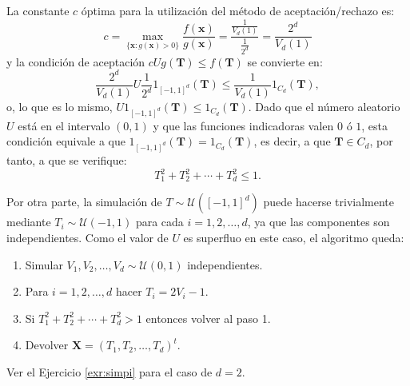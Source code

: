 \documentclass[
]{book}
\theoremstyle{break}
\theoremstyle{definition}
\theoremstyle{definition}
\theoremstyle{definition}
\theoremstyle{definition}
\theoremstyle{remark}
\begin{document}
La constante \(c\) óptima para la utilización del método de
aceptación/rechazo es:
\[c=\max_{\{\mathbf{x}:g\left( \mathbf{x}\right) > 0\}}
\frac{f\left( \mathbf{x}\right)  }{g\left( \mathbf{x}\right)  }
=\frac{\frac{1}{V_d\left( 1\right)  }}{\frac{1}{2^{d}}}
=\frac{2^{d}}{V_d\left( 1\right)}\]
y la condición de aceptación \(cUg\left( \mathbf{T}\right) \leq f\left( \mathbf{T}\right)\) se convierte en:
\[\frac{2^{d}}{V_d\left( 1\right)  }U\frac{1}{2^{d}}1_{\left[  -1,1\right]
^{d}}\left( \mathbf{T}\right)  \leq\frac{1}{V_d\left( 1\right)
}1_{C_d}\left( \mathbf{T}\right),\]
o, lo que es lo mismo, \(U1_{\left[ -1,1\right]^{d}}\left( \mathbf {T}\right) \leq1_{C_d}\left( \mathbf{T}\right)\).
Dado que el número aleatorio \(U\) está en el intervalo \((0,1)\) y que las funciones
indicadoras valen \(0\) ó \(1\), esta condición equivale a que \(1_{\left[ -1,1\right] ^{d}}\left( \mathbf{T}\right) =1_{C_d}\left( \mathbf{T}\right)\), es decir, a que
\(\mathbf{T}\in C_d\), por tanto, a que se verifique:
\[T_1^2+T_2^2+\cdots+T_d^2\leq1.\]

Por otra parte, la simulación de \(T \sim \mathcal{U}\left( \left[ -1,1\right] ^{d}\right)\) puede hacerse trivialmente mediante
\(T_i \sim \mathcal{U}\left( -1, 1 \right)\)
para cada \(i=1,2,\ldots,d\), ya que las
componentes son independientes. Como el valor de \(U\) es superfluo en
este caso, el algoritmo queda:

\begin{enumerate}
\def\labelenumi{\arabic{enumi}.}
\item
  Simular \(V_1,V_2,\ldots,V_d \sim \mathcal{U}\left( 0,1\right)\) independientes.
\item
  Para \(i = 1, 2, \ldots, d\) hacer \(T_i = 2V_i - 1\).
\item
  Si \(T_1^2 + T_2^2 + \cdots + T_d^2 > 1\) entonces volver al paso 1.
\item
  Devolver \(\mathbf{X} = \left( T_1, T_2, \ldots, T_d \right)^t\).
\end{enumerate}

Ver el Ejercicio \ref{exr:simpi} para el caso de \(d=2\).
\end{document}
